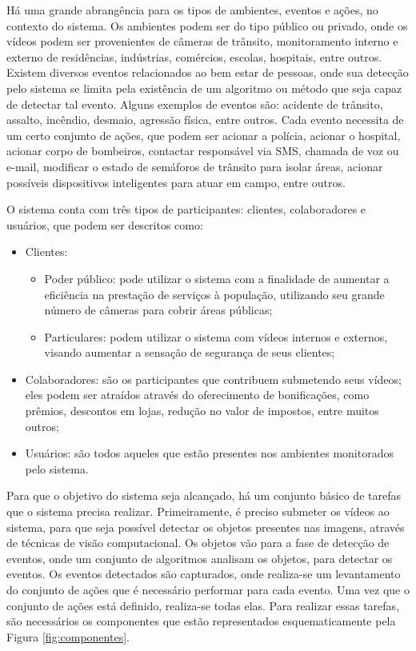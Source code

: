 \documentclass[]{politex}
\begin{document}
Há uma grande abrangência para os tipos de ambientes, eventos e ações, no contexto do sistema. Os ambientes podem ser do tipo público ou privado, onde os vídeos podem ser provenientes de câmeras de trânsito, monitoramento interno e externo de residências, indústrias, comércios, escolas, hospitais, entre outros. Existem diversos eventos relacionados ao bem estar de pessoas, onde sua detecção pelo sistema se limita pela existência de um algoritmo ou método que seja capaz de detectar tal evento. Alguns exemplos de eventos são: acidente de trânsito, assalto, incêndio, desmaio, agressão física, entre outros. Cada evento necessita de um certo conjunto de ações, que podem ser acionar a polícia, acionar o hospital, acionar corpo de bombeiros, contactar responsável via SMS, chamada de voz ou e-mail, modificar o estado de semáforos de trânsito para isolar áreas, acionar possíveis dispositivos inteligentes para atuar em campo, entre outros.

O sistema conta com três tipos de participantes: clientes, colaboradores e usuários, que podem ser descritos como:

\begin{itemize}
    \item Clientes:
    \begin{itemize}
        \item Poder público: pode utilizar o sistema com a finalidade de aumentar a eficiência na prestação de serviços à população, utilizando seu grande número de câmeras para cobrir áreas públicas;
        \item Particulares: podem utilizar o sistema com vídeos internos e externos, visando aumentar a sensação de segurança de seus clientes;
    \end{itemize}
    \item Colaboradores: são os participantes que contribuem submetendo seus vídeos; eles podem ser atraídos através do oferecimento de bonificações, como prêmios, descontos em lojas, redução no valor de impostos, entre muitos outros;
    \item Usuários: são todos aqueles que estão presentes nos ambientes monitorados pelo sistema.
\end{itemize}

Para que o objetivo do sistema seja alcançado, há um conjunto básico de tarefas que o sistema precisa realizar. Primeiramente, é preciso submeter os vídeos ao sistema, para que seja possível detectar os objetos presentes nas imagens, através de técnicas de visão computacional. Os objetos vão para a fase de detecção de eventos, onde um conjunto de algoritmos analisam os objetos, para detectar os eventos. Os eventos detectados são capturados, onde realiza-se um levantamento do conjunto de ações que é necessário performar para cada evento. Uma vez que o conjunto de ações está definido, realiza-se todas elas.  Para realizar essas tarefas, são necessários os componentes que estão representados esquematicamente pela Figura \ref{fig:componentes}.
\end{document}
